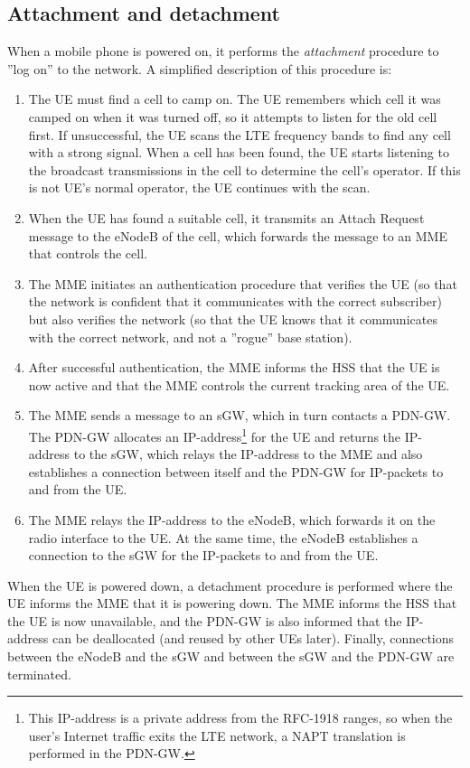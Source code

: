 \subsection{Attachment and detachment}
When a mobile phone is powered on, it performs the \emph{attachment} procedure to ''log on'' to the network. A simplified description of this procedure is:
\begin{enumerate}
%
\item The UE must find a cell to camp on. The UE remembers which cell it was camped on when it was turned off, so it attempts to listen for the old cell first. If unsuccessful, the UE scans the LTE frequency bands to find any cell with a strong signal. When a cell has been found, the UE starts listening to the broadcast transmissions in the cell to determine the cell's operator. If this is not UE's normal operator, the UE continues with the scan.
%
\item When the UE has found a suitable cell, it transmits an Attach Request message to the eNodeB of the cell, which forwards the message to an MME that controls the cell.
%
\item The MME initiates an authentication procedure that verifies the UE (so that the network is confident that it communicates with the correct subscriber) but also verifies the network (so that the UE knows that it communicates with the correct network, and not a ''rogue'' base station).
%
\item After successful authentication, the MME informs the HSS that the UE is now active and that the MME controls the current tracking area of the UE.
%
\item The MME sends a message to an sGW, which in turn contacts a PDN-GW. The PDN-GW allocates an IP-address\footnote{This IP-address is a private address from the RFC-1918 ranges, so when the user's Internet traffic exits the LTE network, a NAPT translation is performed in the PDN-GW.} for the UE and returns the IP-address to the sGW, which relays the IP-address to the MME and also establishes a connection between itself and the PDN-GW for IP-packets to and from the UE.
%
\item The MME relays the IP-address to the eNodeB, which forwards it on the radio interface to the UE. At the same time, the eNodeB establishes a connection to the sGW for the IP-packets to and from the UE.
%
\end{enumerate}

When the UE is powered down, a detachment procedure is performed where the UE informs the MME that it is powering down. The MME informs the HSS that the UE is now unavailable, and the PDN-GW is also informed that the IP-address can be deallocated (and reused by other UEs later). Finally, connections between the eNodeB and the sGW and between the sGW and the PDN-GW are terminated.

